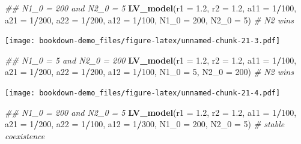 \documentclass[
]{book}
\newenvironment{Shaded}{\begin{snugshade}}{\end{snugshade}}
\newcommand{\CommentTok}[1]{\textcolor[rgb]{0.56,0.35,0.01}{\textit{#1}}}
\newcommand{\DataTypeTok}[1]{\textcolor[rgb]{0.13,0.29,0.53}{#1}}
\newcommand{\DecValTok}[1]{\textcolor[rgb]{0.00,0.00,0.81}{#1}}
\newcommand{\FloatTok}[1]{\textcolor[rgb]{0.00,0.00,0.81}{#1}}
\newcommand{\KeywordTok}[1]{\textcolor[rgb]{0.13,0.29,0.53}{\textbf{#1}}}
\newcommand{\NormalTok}[1]{#1}
\newcommand{\OperatorTok}[1]{\textcolor[rgb]{0.81,0.36,0.00}{\textbf{#1}}}
\begin{document}
\begin{Shaded}
\begin{Highlighting}[]
  \CommentTok{## N1_0 = 200 and N2_0 = 5}
  \KeywordTok{LV_model}\NormalTok{(}\DataTypeTok{r1 =} \FloatTok{1.2}\NormalTok{, }\DataTypeTok{r2 =} \FloatTok{1.2}\NormalTok{, }\DataTypeTok{a11 =} \DecValTok{1}\OperatorTok{/}\DecValTok{100}\NormalTok{, }\DataTypeTok{a21 =} \DecValTok{1}\OperatorTok{/}\DecValTok{200}\NormalTok{, }\DataTypeTok{a22 =} \DecValTok{1}\OperatorTok{/}\DecValTok{200}\NormalTok{, }\DataTypeTok{a12 =} \DecValTok{1}\OperatorTok{/}\DecValTok{100}\NormalTok{, }\DataTypeTok{N1_0 =} \DecValTok{200}\NormalTok{, }\DataTypeTok{N2_0 =} \DecValTok{5}\NormalTok{)  }\CommentTok{# N2 wins}
\end{Highlighting}
\end{Shaded}

\texttt{[image: bookdown-demo\_files/figure-latex/unnamed-chunk-21-3.pdf]}

\begin{Shaded}
\begin{Highlighting}[]
  \CommentTok{## N1_0 = 5 and N2_0 = 200}
  \KeywordTok{LV_model}\NormalTok{(}\DataTypeTok{r1 =} \FloatTok{1.2}\NormalTok{, }\DataTypeTok{r2 =} \FloatTok{1.2}\NormalTok{, }\DataTypeTok{a11 =} \DecValTok{1}\OperatorTok{/}\DecValTok{100}\NormalTok{, }\DataTypeTok{a21 =} \DecValTok{1}\OperatorTok{/}\DecValTok{200}\NormalTok{, }\DataTypeTok{a22 =} \DecValTok{1}\OperatorTok{/}\DecValTok{200}\NormalTok{, }\DataTypeTok{a12 =} \DecValTok{1}\OperatorTok{/}\DecValTok{100}\NormalTok{, }\DataTypeTok{N1_0 =} \DecValTok{5}\NormalTok{, }\DataTypeTok{N2_0 =} \DecValTok{200}\NormalTok{)  }\CommentTok{# N2 wins}
\end{Highlighting}
\end{Shaded}

\texttt{[image: bookdown-demo\_files/figure-latex/unnamed-chunk-21-4.pdf]}

\begin{Shaded}
\begin{Highlighting}[]
  \CommentTok{## N1_0 = 200 and N2_0 = 5}
  \KeywordTok{LV_model}\NormalTok{(}\DataTypeTok{r1 =} \FloatTok{1.2}\NormalTok{, }\DataTypeTok{r2 =} \FloatTok{1.2}\NormalTok{, }\DataTypeTok{a11 =} \DecValTok{1}\OperatorTok{/}\DecValTok{100}\NormalTok{, }\DataTypeTok{a21 =} \DecValTok{1}\OperatorTok{/}\DecValTok{200}\NormalTok{, }\DataTypeTok{a22 =} \DecValTok{1}\OperatorTok{/}\DecValTok{100}\NormalTok{, }\DataTypeTok{a12 =} \DecValTok{1}\OperatorTok{/}\DecValTok{300}\NormalTok{, }\DataTypeTok{N1_0 =} \DecValTok{200}\NormalTok{, }\DataTypeTok{N2_0 =} \DecValTok{5}\NormalTok{)  }\CommentTok{# stable coexistence}
\end{Highlighting}
\end{Shaded}
\end{document}
